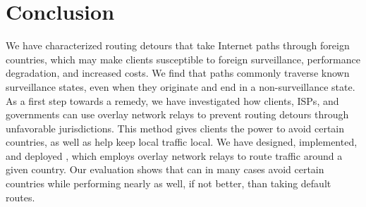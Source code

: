 \section{Conclusion}
\label{conclusion}

We have characterized routing
detours that take Internet paths through foreign countries, which may 
make clients susceptible to foreign surveillance, performance 
degradation, and increased costs.  We find that paths commonly traverse known
surveillance states, even when they originate and end in a
non-surveillance state.  As a first step towards a remedy, we have
investigated how clients, ISPs, and governments can use overlay network relays to prevent routing detours through
unfavorable jurisdictions.  This method gives clients the power to
avoid certain countries, as well as help keep local traffic local.
We have
designed, implemented, and deployed \system{}, which employs overlay network
relays to  route traffic around a given country.  Our evaluation
shows  that \system{} can in many cases avoid certain countries while
performing nearly as well, if not better, than taking default routes.

